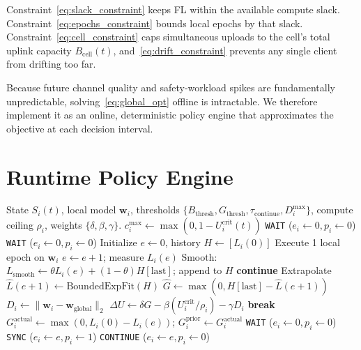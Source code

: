 \documentclass[conference]{IEEEtran}
\begin{document}
Constraint~\eqref{eq:slack_constraint} keeps FL within the available compute slack. Constraint~\eqref{eq:epochs_constraint} bounds local epochs by that slack. Constraint~\eqref{eq:cell_constraint} caps simultaneous uploads to the cell's total uplink capacity $B_{\text{cell}}(t)$, and~\eqref{eq:drift_constraint} prevents any single client from drifting too far.

Because future channel quality and safety-workload spikes are fundamentally unpredictable, solving~\eqref{eq:global_opt} offline is intractable. We therefore implement it as an online, deterministic policy engine that approximates the objective at each decision interval.

\section{Runtime Policy Engine}

\begin{algorithm}[t]
\caption{Dynamic Runtime Policy Engine for FL Vehicle $i$}
\label{alg:policy_engine}
\begin{algorithmic}[1]
\REQUIRE State $S_i(t)$, local model $\mathbf{w}_i$, thresholds $\{B_{\text{thresh}}, G_{\text{thresh}}, \tau_{\text{continue}}, D_i^{\text{max}}\}$, compute ceiling $\rho_i$, weights $\{\delta, \beta, \gamma\}$.
\STATE $c_i^{\text{max}} \leftarrow \max(0, 1 - U_i^{\text{crit}}(t))$
    \RETURN \texttt{WAIT} ($e_i \leftarrow 0, p_i \leftarrow 0$) 
\ENDIF
{}
    \RETURN \texttt{WAIT} ($e_i \leftarrow 0, p_i \leftarrow 0$) 
\ENDIF
\STATE Initialize $e \leftarrow 0$, history $H \leftarrow [L_i(0)]$
    \STATE Execute 1 local epoch on $\mathbf{w}_i$
    \STATE $e \leftarrow e + 1$; measure $L_i(e)$
    \STATE Smooth: $L_{\text{smooth}} \leftarrow \theta L_i(e) + (1-\theta) H[\text{last}]$; append to $H$
        \STATE \textbf{continue}
    \ENDIF
    \STATE Extrapolate $\widehat{L}(e+1) \leftarrow \text{BoundedExpFit}(H)$
    \STATE $\widehat{G} \leftarrow \max(0, H[\text{last}] - \widehat{L}(e+1))$
    \STATE $D_i \leftarrow \| \mathbf{w}_i - \mathbf{w}_{\text{global}} \|_2$
    \STATE $\Delta U \leftarrow \delta \widehat{G} - \beta (U_i^{\text{crit}} / \rho_i) - \gamma D_i$
        \STATE \textbf{break}
    \ENDIF
\ENDWHILE
\STATE $G_i^{\text{actual}} \leftarrow \max(0, L_i(0) - L_i(e))$; $G_i^{\text{prior}} \leftarrow G_i^{\text{actual}}$
    \RETURN \texttt{WAIT} ($e_i \leftarrow 0, p_i \leftarrow 0$)
\ENDIF
{}
    \RETURN \texttt{SYNC} ($e_i \leftarrow e, p_i \leftarrow 1$) 
\ELSE
    \RETURN \texttt{CONTINUE} ($e_i \leftarrow e, p_i \leftarrow 0$) 
\ENDIF
\end{algorithmic}
\end{algorithm}
\end{document}
